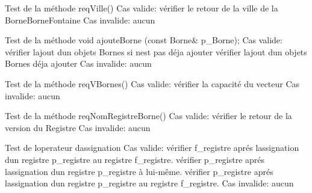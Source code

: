 
\begin{DoxyRefList}
\item[Member \mbox{\hyperlink{_borne_fontaine_taisteur_8cpp_a246eca880dd221cc6d9565f476d99394}{T\+E\+S\+T\+\_\+F}} (\mbox{\hyperlink{class_un_borne_borne_fontaine}{Un\+Borne\+Borne\+Fontaine}}, req\+Ville)]\label{test__test000001}%
%
Test de la méthode req\+Ville() Cas valide\+: vérifier le retour de la ville de la Borne\+Borne\+Fontaine Cas invalide\+: aucun  
\item[Member \mbox{\hyperlink{_registre_borne_testeur_8cpp_aca77c47e2411f1e1814062f781ae3363}{T\+E\+S\+T\+\_\+F}} (\mbox{\hyperlink{classun_registre_borne}{un\+Registre\+Borne}}, ajoute\+Nouveau\+Borne)]\label{test__test000018}%
%
Test de la méthode void ajoute\+Borne (const Borne\& p\+\_\+\+Borne); Cas valide\+: vérifier l\textquotesingle{}ajout d\textquotesingle{}un objets Bornes si n\textquotesingle{}est pas déja ajouter vérifier l\textquotesingle{}ajout d\textquotesingle{}un objets Bornes déja ajouter Cas invalide\+: aucun  
\item[Member \mbox{\hyperlink{_registre_borne_testeur_8cpp_a644d3c35175c00fb481d339f403c6c9d}{T\+E\+S\+T\+\_\+F}} (\mbox{\hyperlink{classun_registre_borne}{un\+Registre\+Borne}}, req\+V\+Bornes)]\label{test__test000017}%
%
Test de la méthode req\+V\+Bornes() Cas valide\+: vérifier la capacité du vecteur Cas invalide\+: aucun  
\item[Member \mbox{\hyperlink{_registre_borne_testeur_8cpp_a98010815eb87b2bd37d3a83356ee088d}{T\+E\+S\+T\+\_\+F}} (\mbox{\hyperlink{classun_registre_borne}{un\+Registre\+Borne}}, req\+Nom\+Registre\+Borne)]\label{test__test000016}%
%
Test de la méthode req\+Nom\+Registre\+Borne() Cas valide\+: vérifier le retour de la version du Registre Cas invalide\+: aucun  
\item[Member \mbox{\hyperlink{_registre_borne_testeur_8cpp_a638a47befad78c00ad514b4d9c101463}{T\+E\+S\+T\+\_\+F}} (\mbox{\hyperlink{classun_registre_borne}{un\+Registre\+Borne}}, Assignation\+Registre\+A\+Registre)]\label{test__test000015}%
%
Test de l\textquotesingle{}operateur d\textquotesingle{}assignation Cas valide\+: vérifier f\+\_\+registre aprés l\textquotesingle{}assignation d\textquotesingle{}un registre p\+\_\+registre au registre f\+\_\+registre. vérifier p\+\_\+registre aprés l\textquotesingle{}assignation d\textquotesingle{}un registre p\+\_\+registre à lui-\/même. vérifier p\+\_\+registre aprés l\textquotesingle{}assignation d\textquotesingle{}un registre p\+\_\+registre au registre f\+\_\+registre. Cas invalide\+: aucun  

\end{DoxyRefList}
